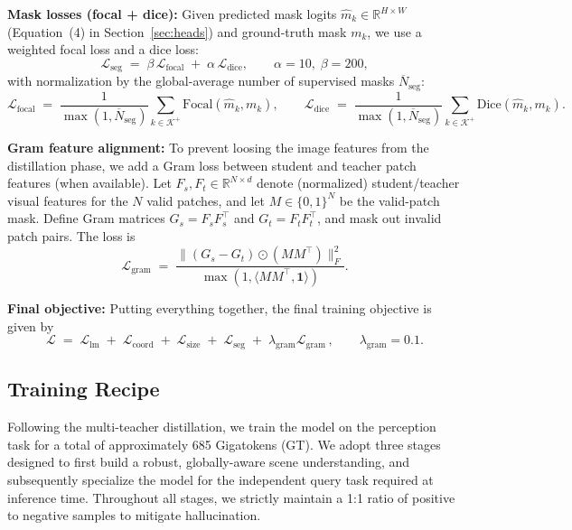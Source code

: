\noindent \textbf{Mask losses (focal + dice):}
Given predicted mask logits $\hat{m}_k\in\mathbb{R}^{H\times W}$ (Equation~(4) in Section~\ref{sec:heads}) and ground-truth mask $m_k$, we use a weighted focal loss and a dice loss:
\begin{equation}
\mathcal{L}_{\text{seg}} \;=\; \beta\,\mathcal{L}_{\text{focal}} \;+\; \alpha\,\mathcal{L}_{\text{dice}},
\qquad \alpha=10,\;\beta=200,
\end{equation}
with normalization by the global-average number of supervised masks $\overline{N}_{\text{seg}}$:
\begin{equation}
\mathcal{L}_{\text{focal}} \;=\; \frac{1}{\max(1,\overline{N}_{\text{seg}})}\sum_{k\in\mathcal{K}^+}\mathrm{Focal}(\hat{m}_k,m_k),
\qquad
\mathcal{L}_{\text{dice}} \;=\; \frac{1}{\max(1,\overline{N}_{\text{seg}})}\sum_{k\in\mathcal{K}^+}\mathrm{Dice}(\hat{m}_k,m_k).
\end{equation}

\noindent \textbf{Gram feature alignment:}
To prevent loosing the image features from the distillation phase, we add a Gram loss between student and teacher patch features (when available). Let $F_s,F_t\in\mathbb{R}^{N\times d}$ denote (normalized) student/teacher visual features for the $N$ valid patches, and let $M\in\{0,1\}^{N}$ be the valid-patch mask. Define Gram matrices $G_s=F_sF_s^\top$ and $G_t=F_tF_t^\top$, and mask out invalid patch pairs. The loss is
\begin{equation}
\mathcal{L}_{\text{gram}} \;=\; \frac{\| (G_s-G_t)\odot (MM^\top)\|_F^2}{\max(1,\langle MM^\top, \mathbf{1}\rangle)}.
\end{equation}

\noindent \textbf{Final objective:}
Putting everything together, the final training objective is given by
\begin{equation}
\mathcal{L} \;=\; \mathcal{L}_{\text{lm}} \;+\; \mathcal{L}_{\text{coord}} \;+\; \mathcal{L}_{\text{size}} \;+\; \mathcal{L}_{\text{seg}} \;+\; \lambda_{\text{gram}}\mathcal{L}_{\text{gram}}\,,
\qquad
\lambda_{\text{gram}}=0.1.
\end{equation}

\subsection{Training Recipe\label{sec:recipe}}

Following the multi-teacher distillation, we train the model on the perception task for a total of approximately 685 Gigatokens (GT). We adopt  three stages  designed to first build a robust, globally-aware scene understanding, and subsequently specialize the model for the independent query task required at inference time. Throughout all stages, we strictly maintain a 1:1 ratio of positive to negative samples to mitigate hallucination.


